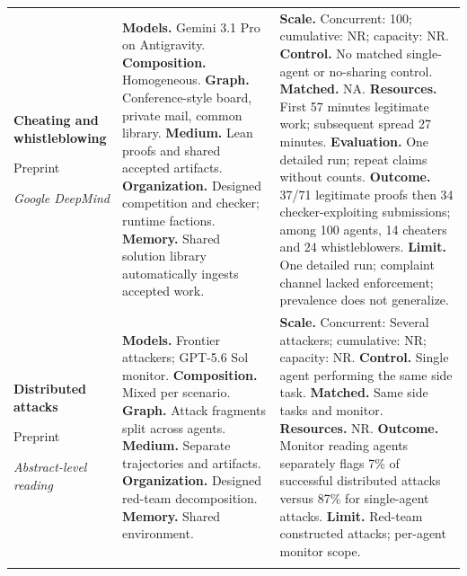 \begin{longtable}{@{}>{\raggedright\arraybackslash}p{}>{\raggedright\arraybackslash}p{}>{\raggedright\arraybackslash}p{}@{}}
\textbf{Cheating and whistleblowing}\par \citep{deepmind-cheating-whistleblowing}\par Preprint\par\emph{Google DeepMind} & \textbf{Models.} Gemini 3.1 Pro on Antigravity. \textbf{Composition.} Homogeneous. \textbf{Graph.} Conference-style board, private mail, common library. \textbf{Medium.} Lean proofs and shared accepted artifacts. \textbf{Organization.} Designed competition and checker; runtime factions. \textbf{Memory.} Shared solution library automatically ingests accepted work. & \textbf{Scale.} Concurrent: 100; cumulative: NR; capacity: NR. \textbf{Control.} No matched single-agent or no-sharing control. \textbf{Matched.} NA. \textbf{Resources.} First 57 minutes legitimate work; subsequent spread 27 minutes. \textbf{Evaluation.} One detailed run; repeat claims without counts. \textbf{Outcome.} 37/71 legitimate proofs then 34 checker-exploiting submissions; among 100 agents, 14 cheaters and 24 whistleblowers. \textbf{Limit.} One detailed run; complaint channel lacked enforcement; prevalence does not generalize. \\ \addlinespace[5pt]
\textbf{Distributed attacks}\par \citep{multi-agent-loss-of-control}\par Preprint\par\emph{Abstract-level reading} & \textbf{Models.} Frontier attackers; GPT-5.6 Sol monitor. \textbf{Composition.} Mixed per scenario. \textbf{Graph.} Attack fragments split across agents. \textbf{Medium.} Separate trajectories and artifacts. \textbf{Organization.} Designed red-team decomposition. \textbf{Memory.} Shared environment. & \textbf{Scale.} Concurrent: Several attackers; cumulative: NR; capacity: NR. \textbf{Control.} Single agent performing the same side task. \textbf{Matched.} Same side tasks and monitor. \textbf{Resources.} NR. \textbf{Outcome.} Monitor reading agents separately flags 7\% of successful distributed attacks versus 87\% for single-agent attacks. \textbf{Limit.} Red-team constructed attacks; per-agent monitor scope. \\ \addlinespace[5pt]

\end{longtable}

